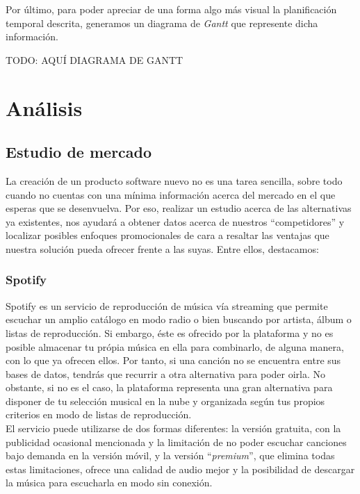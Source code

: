 Por último, para poder apreciar de una forma algo más visual la planificación temporal descrita, generamos un diagrama de \textit{Gantt} que represente dicha información.

TODO: AQUÍ DIAGRAMA DE GANTT

\section{Análisis}
\label{sec:analisis}

\subsection{Estudio de mercado}

La creación de un producto software nuevo no es una tarea sencilla, sobre todo cuando no cuentas con una mínima información acerca del mercado en el que esperas que se desenvuelva. Por eso, realizar un estudio acerca de las alternativas ya existentes, nos ayudará a obtener datos acerca de nuestros ``competidores'' y localizar posibles enfoques promocionales de cara a resaltar las ventajas que nuestra solución pueda ofrecer frente a las suyas. Entre ellos, destacamos:

\subsubsection{Spotify \cite{Spotify}}
Spotify es un servicio de reproducción de música vía streaming que permite escuchar un amplio catálogo en modo radio o bien buscando por artista, álbum o listas de reproducción. Si embargo, éste es ofrecido por la plataforma y no es posible almacenar tu própia música en ella para combinarlo, de alguna manera, con lo que ya ofrecen ellos. Por tanto, si una canción no se encuentra entre sus bases de datos, tendrás que recurrir a otra alternativa para poder oirla. No obstante, si no es el caso, la plataforma representa una gran alternativa para disponer de tu selección musical en la nube y organizada según tus propios criterios en modo de listas de reproducción.\\

El servicio puede utilizarse de dos formas diferentes: la versión gratuita, con la publicidad ocasional mencionada y la limitación de no poder escuchar canciones bajo demanda en la versión móvil, y la versión ``\textit{premium}'', que elimina todas estas limitaciones, ofrece una calidad de audio mejor y la posibilidad de descargar la música para escucharla en modo sin conexión.

